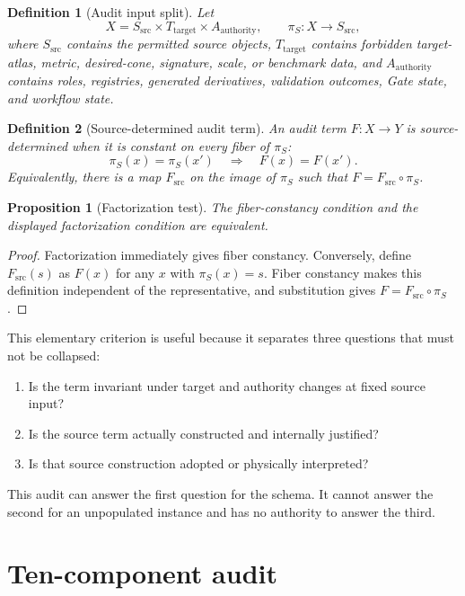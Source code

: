\documentclass[11pt]{article}
\newtheorem{definition}{Definition}
\newtheorem{proposition}{Proposition}
\newcommand{\src}{\mathrm{src}}
\begin{document}
\begin{definition}[Audit input split]
Let
\[
  X=S_{\src}\times T_{\mathrm{target}}\times A_{\mathrm{authority}},
  \qquad \pi_S:X\longrightarrow S_{\src},
\]
where $S_{\src}$ contains the permitted source objects,
$T_{\mathrm{target}}$ contains forbidden target-atlas, metric, desired-cone,
signature, scale, or benchmark data, and $A_{\mathrm{authority}}$ contains
roles, registries, generated derivatives, validation outcomes, Gate state, and
workflow state.
\end{definition}

\begin{definition}[Source-determined audit term]
An audit term $F:X\to Y$ is source-determined when it is constant on every
fiber of $\pi_S$:
\[
  \pi_S(x)=\pi_S(x')\quad\Longrightarrow\quad F(x)=F(x').
\]
Equivalently, there is a map $F_{\src}$ on the image of $\pi_S$ such that
$F=F_{\src}\circ\pi_S$.
\end{definition}

\begin{proposition}[Factorization test]
The fiber-constancy condition and the displayed factorization condition are
equivalent.
\end{proposition}
\begin{proof}
Factorization immediately gives fiber constancy.  Conversely, define
$F_{\src}(s)$ as $F(x)$ for any $x$ with $\pi_S(x)=s$.  Fiber constancy makes
this definition independent of the representative, and substitution gives
$F=F_{\src}\circ\pi_S$.
\end{proof}

This elementary criterion is useful because it separates three questions that
must not be collapsed:
\begin{enumerate}
  \item Is the term invariant under target and authority changes at fixed
        source input?
  \item Is the source term actually constructed and internally justified?
  \item Is that source construction adopted or physically interpreted?
\end{enumerate}
This audit can answer the first question for the schema.  It cannot answer the
second for an unpopulated instance and has no authority to answer the third.

\section{Ten-component audit}
\end{document}
